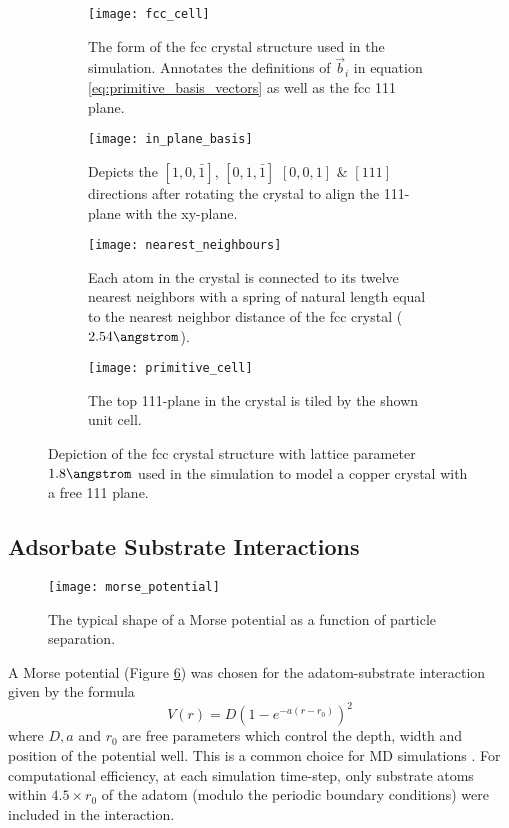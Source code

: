 \begin{figure}
	\begin{subfigure}[t]{0.45\textwidth}
		\centering
		\texttt{[image: fcc\_cell]}
		\caption{The form of the fcc crystal structure used in the simulation. Annotates the definitions of $\vec{b}_i$ in equation \ref{eq:primitive_basis_vectors} as well as the fcc 111 plane.} \label{fig:fcc_cell} 
	\end{subfigure}
	\hfill
	\begin{subfigure}[t]{0.45\textwidth}
		\centering
		\texttt{[image: in\_plane\_basis]}
		\caption{Depicts the $\left[1,0,\bar{1}\right]$, $\left[0,1,\bar{1}\right]$ $\left[0,0,1\right]$ \& $\left[111\right]$ directions after rotating the crystal to align the 111-plane with the xy-plane.\label{fig:in_plane_basis}}
	\end{subfigure}
	\hfill
	\begin{subfigure}[t]{0.45\textwidth}
		\centering
		\texttt{[image: nearest\_neighbours]}
		\caption{Each atom in the crystal is connected to its twelve nearest neighbors with a spring of natural length equal to the nearest neighbor distance of the fcc crystal ($2.54\angstrom$).} \label{fig:nearest_neighbours}	
	\end{subfigure}
	\hfill
	\begin{subfigure}[t]{0.45\textwidth}
		\centering
		\texttt{[image: primitive\_cell]}
		\caption{The top 111-plane in the crystal is tiled by the shown unit cell.} \label{fig:in_plane_cell}
	\end{subfigure}
\caption{Depiction of the fcc crystal structure with lattice parameter $1.8\angstrom$ used in the simulation to model a copper crystal with a free 111 plane.}
\label{fig:crystal_structure}
\end{figure}

\subsection{Adsorbate Substrate Interactions}

\begin{figure}
	\centering
	\texttt{[image: morse\_potential]}
	\caption{The typical shape of a Morse potential as a function of particle separation.}
	\label{fig:morse_potential}
\end{figure}

A Morse potential (Figure \ref{fig:morse_potential}) was chosen for the adatom-substrate interaction given by the formula 
\begin{equation}
	V\left(r\right) = D(1-e^{-a\left(r-r_0\right)})^2 \label{eq:morse}
\end{equation}
where $D,a$ and $r_0$ are free parameters which control the depth, width and position of the potential well. This is a common choice for MD simulations \cite{SHUSTOROVICH19981, ELLIS199499}. For computational efficiency, at each simulation time-step, only substrate atoms within $4.5 \times r_0$ of the adatom (modulo the periodic boundary conditions) were included in the interaction. 

